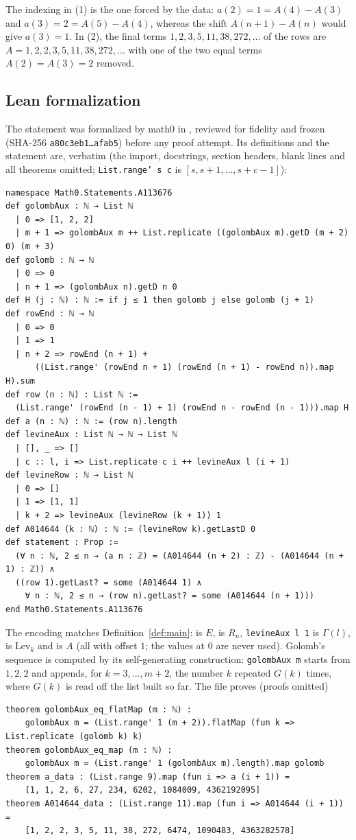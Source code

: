\documentclass[11pt]{amsart}
\theoremstyle{plain}
\theoremstyle{definition}
\newcommand{\Lev}{\mathrm{Lev}}
\begin{document}
The indexing in (1) is the one forced by the data: $a(2)=1=A(4)-A(3)$ and $a(3)=2=A(5)-A(4)$, whereas the shift $A(n+1)-A(n)$ would give $a(3)=1$. In (2), the final terms $1,2,3,5,11,38,272,\dots$ of the rows are $A=1,2,2,3,5,11,38,272,\dots$ with one of the two equal terms $A(2)=A(3)=2$ removed.

\subsection*{Lean formalization}
The statement was formalized by math0 in , reviewed for fidelity and frozen (SHA-256 \texttt{a80c3eb1\ldots afab5}) before any proof attempt. Its definitions and the statement are, verbatim (the import, docstrings, section headers, blank lines and all theorems omitted; \texttt{List.range' s c} is $[s,s+1,\dots,s+c-1]$):
\begin{lstlisting}
namespace Math0.Statements.A113676
def golombAux : ℕ → List ℕ
  | 0 => [1, 2, 2]
  | m + 1 => golombAux m ++ List.replicate ((golombAux m).getD (m + 2) 0) (m + 3)
def golomb : ℕ → ℕ
  | 0 => 0
  | n + 1 => (golombAux n).getD n 0
def H (j : ℕ) : ℕ := if j ≤ 1 then golomb j else golomb (j + 1)
def rowEnd : ℕ → ℕ
  | 0 => 0
  | 1 => 1
  | n + 2 => rowEnd (n + 1) +
      ((List.range' (rowEnd n + 1) (rowEnd (n + 1) - rowEnd n)).map H).sum
def row (n : ℕ) : List ℕ :=
  (List.range' (rowEnd (n - 1) + 1) (rowEnd n - rowEnd (n - 1))).map H
def a (n : ℕ) : ℕ := (row n).length
def levineAux : List ℕ → ℕ → List ℕ
  | [], _ => []
  | c :: l, i => List.replicate c i ++ levineAux l (i + 1)
def levineRow : ℕ → List ℕ
  | 0 => []
  | 1 => [1, 1]
  | k + 2 => levineAux (levineRow (k + 1)) 1
def A014644 (k : ℕ) : ℕ := (levineRow k).getLastD 0
def statement : Prop :=
  (∀ n : ℕ, 2 ≤ n → (a n : ℤ) = (A014644 (n + 2) : ℤ) - (A014644 (n + 1) : ℤ)) ∧
  ((row 1).getLast? = some (A014644 1) ∧
    ∀ n : ℕ, 2 ≤ n → (row n).getLast? = some (A014644 (n + 1)))
end Math0.Statements.A113676
\end{lstlisting}
The encoding matches Definition~\ref{def:main}:  is $E$,  is $R_n$, \texttt{levineAux l 1} is $\Gamma(l)$,  is $\Lev_k$ and  is $A$ (all with offset $1$; the values at $0$ are never used). Golomb's sequence is computed by its self-generating construction: \texttt{golombAux m} starts from $1,2,2$ and appends, for $k=3,\dots,m+2$, the number $k$ repeated $G(k)$ times, where $G(k)$ is read off the list built so far. The file proves (proofs omitted)
\begin{lstlisting}
theorem golombAux_eq_flatMap (m : ℕ) :
    golombAux m = (List.range' 1 (m + 2)).flatMap (fun k => List.replicate (golomb k) k)
theorem golombAux_eq_map (m : ℕ) :
    golombAux m = (List.range' 1 (golombAux m).length).map golomb
theorem a_data : (List.range 9).map (fun i => a (i + 1)) =
    [1, 1, 2, 6, 27, 234, 6202, 1084009, 4362192095]
theorem A014644_data : (List.range 11).map (fun i => A014644 (i + 1)) =
    [1, 2, 2, 3, 5, 11, 38, 272, 6474, 1090483, 4363282578]
\end{lstlisting}
\end{document}
